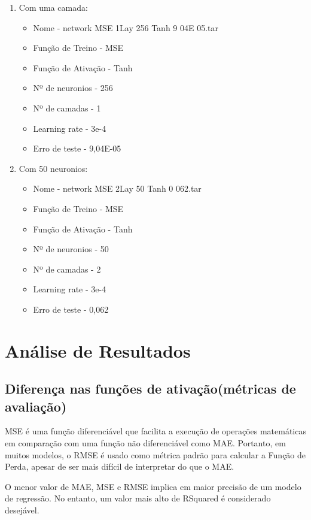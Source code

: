 \documentclass[10pt]{article}
\begin{document}
\begin{enumerate}
\begin{itemize}
  \end{itemize}
  \vspace{1cm}
  \item Com uma camada:
    \begin{itemize}
      \item Nome - network MSE 1Lay 256 Tanh 9 04E 05.tar
      \item Função de Treino - MSE
      \item Função de Ativação - Tanh
      \item Nº de neuronios - 256
      \item Nº de camadas - 1
      \item Learning rate - 3e-4
      \item Erro de teste - 9,04E-05
    \end{itemize}  
    \vspace{1cm}
    \item Com 50 neuronios:
    \begin{itemize}
      \item Nome - network MSE 2Lay 50 Tanh 0 062.tar
      \item Função de Treino - MSE
      \item Função de Ativação - Tanh
      \item Nº de neuronios - 50
      \item Nº de camadas - 2
      \item Learning rate - 3e-4
      \item Erro de teste - 0,062
    \end{itemize}
\end{enumerate}
\newpage

\section{Análise de Resultados}\label{sec:ev-da-org}
\subsection{Diferença nas funções de ativação(métricas de avaliação)}

MSE é uma função diferenciável que facilita a execução de 
operações matemáticas em comparação com uma função 
não diferenciável como MAE. 
Portanto, em muitos modelos, o RMSE é usado como métrica 
padrão para calcular a Função de Perda, apesar de ser mais 
difícil de interpretar do que o MAE.

O menor valor de MAE, MSE e RMSE implica em maior precisão 
de um modelo de regressão. No entanto, um valor mais alto de 
RSquared é considerado desejável.
\end{document}
